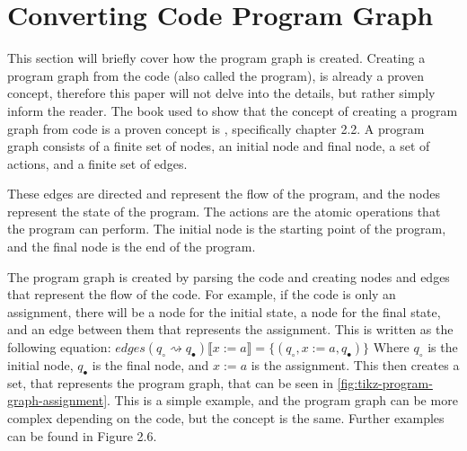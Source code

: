\section{Converting Code Program Graph}
This section will briefly cover how the program graph is created.
Creating a program graph from the code (also called the program), is already a proven concept, therefore this paper will not delve into the details, but rather simply inform the reader.
The book used to show that the concept of creating a program graph from code is a proven concept is \cite{nielson_formal_2019}, specifically chapter 2.2.
A program graph consists of a finite set of nodes, an initial node and final node, a set of actions, and a finite set of edges.

These edges are directed and represent the flow of the program, and the nodes represent the state of the program. The actions are the atomic operations that the program can perform. The initial node is the starting point of the program, and the final node is the end of the program.

The program graph is created by parsing the code and creating nodes and edges that represent the flow of the code. For example, if the code is only an assignment, there will be a node for the initial state, a node for the final state, and an edge between them that represents the assignment. This is written as the following equation:
$edges(q_{\circ} \rightsquigarrow q_{\bullet})\llbracket x:=a \rrbracket = \{(q_{\circ}, x:=a, q_{\bullet})\}$
Where $q_{\circ}$ is the initial node, $q_{\bullet}$ is the final node, and $x:=a$ is the assignment. This then creates a set, that represents the program graph, that can be seen in \autoref{fig:tikz-program-graph-assignment}. This is a simple example, and the program graph can be more complex depending on the code, but the concept is the same.
Further examples can be found in \cite{nielson_formal_2019} Figure 2.6.

